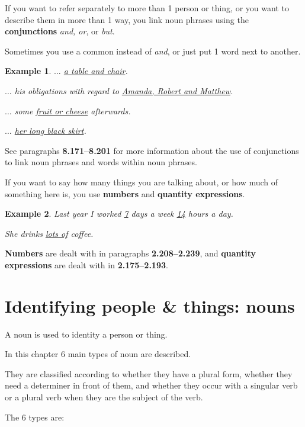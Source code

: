 \documentclass[oneside]{book}
\numberwithin{equation}{section}
\newtheorem{example}{Example}[section]
\begin{document}
%
\noindent{} If you want to refer separately to more than 1 person or thing, or you want to describe them in more than 1 way, you link noun phrases using the \textbf{conjunctions} \textit{and, or}, or \textit{but}.

Sometimes you use a common instead of \textit{and}, or just put 1 word next to another.
\begin{example}
    $\ldots$ \underline{a table and chair}.
    
    $\ldots$ his obligations with regard to \underline{Amanda, Robert and Matthew}.
    
    $\ldots$ some \underline{fruit or cheese} afterwards.
    
    $\ldots$ \underline{her long black skirt}.
\end{example}
See paragraphs \textbf{8.171--8.201} for more information about the use of conjunctions to link noun phrases and words within noun phrases.

\noindent{} If you want to say how many things you are talking about, or how much of something here is, you use \textbf{numbers} and \textbf{quantity expressions}.
\begin{example}
    Last year I worked \underline{7} days a week \underline{14} hours a day.
    
    She drinks \underline{lots of} coffee.
\end{example}
\textbf{Numbers} are dealt with in paragraphs \textbf{2.208--2.239}, and \textbf{quantity expressions} are dealt with in \textbf{2.175--2.193}.

\section{Identifying people \& things: nouns}
\noindent{} A noun is used to identity a person or thing.

In this chapter 6 main types of noun are described.

They are classified according to whether they have a plural form, whether they need a determiner in front of them, and whether they occur with a singular verb or a plural verb when they are the subject of the verb.

%
The 6 types are:
\end{document}
